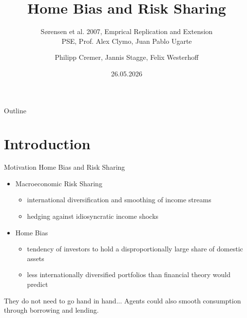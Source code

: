\documentclass[aspectratio=169, 10pt]{beamer}
\title{Home Bias and Risk Sharing}
\subtitle{Sørensen et al. 2007, Emprical Replication and Extension \\ PSE, Prof. Alex Clymo, Juan Pablo Ugarte}
\author{Philipp Cremer, Jannis Stagge, Felix Westerhoff}
\date{26.05.2026}
\begin{document}

\maketitle

\begin{frame}{Outline}
  \tableofcontents
\end{frame}


\section{Introduction}

\begin{frame}{Motivation Home Bias and Risk Sharing}
  \begin{itemize}
    \item Macroeconomic Risk Sharing
      \begin{itemize}
        \item international diversification and smoothing of income streams
        \item hedging against idiosyncratic income shocks
      \end{itemize}
    \end{itemize}

  \begin{itemize}
    \item  Home Bias
      \begin{itemize}
        \item tendency of investors to hold a disproportionally large share of domestic assets
        \item less internationally diversified portfolios than financial theory would predict
      \end{itemize}
    \end{itemize}

    \vfill

  \begin{block}{They do not need to go hand in hand...}
    Agents could also smooth consumption through borrowing and lending. 
  \end{block}

\end{frame}

\end{document}
